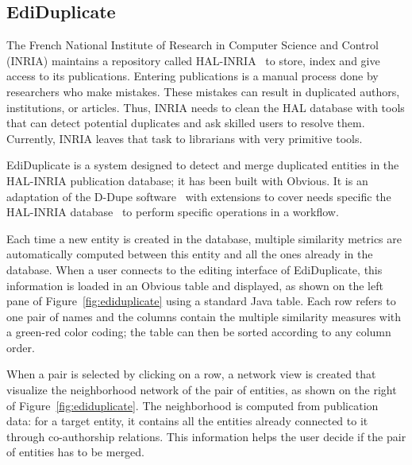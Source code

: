 \subsection{EdiDuplicate}

The French National Institute of Research in Computer Science and
Control (INRIA) maintains a repository called HAL-INRIA~\cite{HAL} to
store, index and give access to its publications.  Entering
publications is a manual process done by researchers who make
mistakes.  These mistakes can result in duplicated authors,
institutions, or articles. Thus, INRIA needs to clean the HAL database
with tools that can detect potential duplicates and ask skilled users
to resolve them.  Currently, INRIA leaves that task to librarians with
very primitive tools.

EdiDuplicate is a system designed to detect and merge duplicated
entities in the HAL-INRIA publication database; it has been built
with Obvious.  It is an adaptation of the D-Dupe software~\cite{DDupe}
with extensions to cover needs specific the HAL-INRIA
database~\cite{HAL} to perform specific operations in a workflow.

Each time a new entity is created in the database, multiple similarity
metrics are automatically computed between this entity and all the ones
already in the database.  When a user connects to the editing
interface of EdiDuplicate, this information is loaded in an Obvious
table and displayed, as shown on the left pane of
Figure~\ref{fig:ediduplicate} using a standard Java table.  Each row
refers to one pair of names and the columns contain the multiple
similarity measures with a green-red color coding; the table can
then be sorted according to any column order.

When a pair is selected by clicking on a row, a network view is created
that visualize the neighborhood network of the pair of entities, as
shown on the right of Figure~\ref{fig:ediduplicate}.  The
neighborhood is computed from publication data: for a target entity,
it contains all the entities already connected to it through
co-authorship relations.  This information helps the user decide if
the pair of entities has to be merged.

